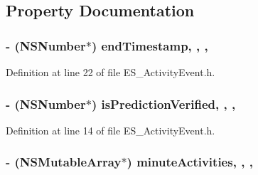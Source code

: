 \subsection{Property Documentation}
\hypertarget{interface_e_s___activity_event_a8f1fd8e2af86190cb2430d1dcde465e6}{
\subsubsection[{end\+Timestamp}]{\setlength{\rightskip}{0pt plus 5cm}-\/ (N\+S\+Number$\ast$) end\+Timestamp\hspace{0.3cm}{\ttfamily [read]}, {\ttfamily [write]}, {\ttfamily [nonatomic]}, {\ttfamily [retain]}}}\label{interface_e_s___activity_event_a8f1fd8e2af86190cb2430d1dcde465e6}


Definition at line 22 of file E\+S\+\_\+\+Activity\+Event.\+h.

\hypertarget{interface_e_s___activity_event_a9a3ff1116db773b1f40c6baa06bef2eb}{
\subsubsection[{is\+Prediction\+Verified}]{\setlength{\rightskip}{0pt plus 5cm}-\/ (N\+S\+Number$\ast$) is\+Prediction\+Verified\hspace{0.3cm}{\ttfamily [read]}, {\ttfamily [write]}, {\ttfamily [nonatomic]}, {\ttfamily [retain]}}}\label{interface_e_s___activity_event_a9a3ff1116db773b1f40c6baa06bef2eb}


Definition at line 14 of file E\+S\+\_\+\+Activity\+Event.\+h.

\hypertarget{interface_e_s___activity_event_a8cb77cfb5866f39dc2080534129d7c72}{
\subsubsection[{minute\+Activities}]{\setlength{\rightskip}{0pt plus 5cm}-\/ (N\+S\+Mutable\+Array$\ast$) minute\+Activities\hspace{0.3cm}{\ttfamily [read]}, {\ttfamily [write]}, {\ttfamily [nonatomic]}, {\ttfamily [retain]}}}\label{interface_e_s___activity_event_a8cb77cfb5866f39dc2080534129d7c72}


